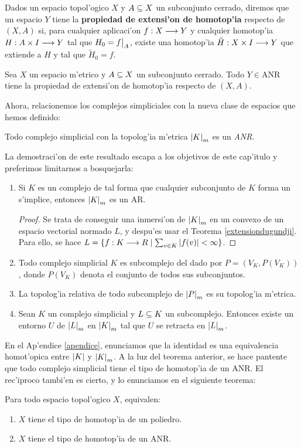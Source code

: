 Dados un espacio topol'ogico  $ X  $  y $ A\subseteq X  $ un subconjunto cerrado, diremos que un espacio  $ Y  $ tiene la \textbf{propiedad de extensi'on de homotop'ia} respecto de $ (X,A ) $ si, para cualquier aplicaci'on $ f:X\longrightarrow Y  $ y cualquier homotop'ia $ H:A\times I\longrightarrow Y  $ tal que $ H_0 =  \rest{f }{A} $, existe una homotop'ia $ \tilde{H}:X\times I\longrightarrow Y  $ que extiende a $ H  $ y tal que $ \tilde{H }_0 = f  $.

\begin{theorem}
  Sea $ X  $ un espacio m'etrico y $ A\subseteq X  $ un subconjunto cerrado. Todo $ Y\in \text{ANR } $  tiene la propiedad de extensi'on de homotop'ia respecto de $ (X,A ) $.
\end{theorem}

Ahora, relacionemos los complejos simpliciales con la nueva clase de espacios que hemos definido:
\begin{theorem}
  Todo complejo simplicial con la topolog'ia m'etrica  $ \abs{K}_m $ es un \emph{ANR}.
\end{theorem}
La demostraci'on de este resultado escapa a los objetivos de este cap'itulo y preferimos limitarnos a bosquejarla:
\begin{enumerate}
  \item Si $ K  $ es un complejo de tal forma que cualquier subconjunto de $ K  $ forma un s'implice, entonces $ \abs{K }_m$ es un AR.
  \begin{proof}
    Se trata de conseguir una inmersi'on de $ \abs{K }_m  $ en un convexo de un espacio vectorial normado $ L $, y despu'es usar el Teorema \ref{extensiondugundji}. Para ello, se hace $ L = \{f:K \longrightarrow R\mid \sum_{v\in K}\abs{f(v)}<\infty  \} $.
  \end{proof}
  \item Todo complejo simplicial $ K  $ es subcomplejo del dado por $ P = (V_K, P(V_K)) $, donde $ P(V_K ) $ denota el conjunto de  todos sus subconjuntos.
  \item La topolog'ia relativa de todo subcomplejo de $ \abs{P}_m   $ es su topolog'ia m'etrica.
  \item Sean $ K $ un complejo simplicial y $ L\subseteq K  $ un subcomplejo. Entonces existe un entorno $ U  $ de  $ \abs{L }_m  $ en $ \abs{K }_m  $ tal que $ U  $ se retracta en $ \abs{L }_m  $.
\end{enumerate}

En el Ap'endice \ref{apendice}, enunciamos que la identidad es una equivalencia homot'opica entre $ \abs{K }$ y $ \abs{K }_m  $. A la luz del teorema anterior, se hace pantente que todo complejo simplicial tiene el tipo de homotop'ia de un ANR. El rec'iproco tambi'en es cierto, y lo enunciamos en el siguiente teorema:


\begin{theorem}\label{complejoanr}
  Para todo espacio topol'ogico $ X  $, equivalen:
  \begin{enumerate}
    \item $ X  $ tiene el tipo de homotop'ia de un poliedro.
    \item $ X  $ tiene el tipo de homotop'ia de un ANR.
  \end{enumerate}
\end{theorem}
